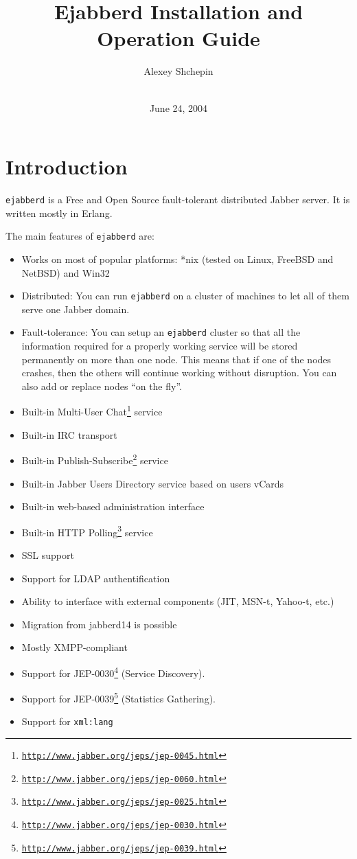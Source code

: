 \documentclass[a4paper,10pt]{article}
\title{Ejabberd Installation and Operation Guide}
\author{Alexey Shchepin \\
  \ahrefurl{mailto:alexey@sevcom.net} \\
  \ahrefurl{xmpp:aleksey@jabber.ru}}
\date{June 24, 2004}
\newcommand{\logoscale}{0.7}
\newcommand{\insscaleimg}[2]{
  \imgsrc{#2}{}
  \begin{latexonly}
    \scalebox{#1}{\texttt{[image: \#2]}}
  \end{latexonly}
}
\newcommand{\ns}[1]{\texttt{#1}}
\newcommand{\ejabberd}{\texttt{ejabberd}}
\newcommand{\Jabber}{Jabber}
\gdef\footahref#1#2{#2\footnote{\href{#1}{\texttt{#1}}}}
\newcommand{\tjepref}[2]{\footahref{http://www.jabber.org/jeps/jep-#1.html}{#2}}
\newcommand{\jepref}[1]{\tjepref{#1}{JEP-#1}}
\begin{document}
\begin{titlepage}
  \maketitle{}
  
  {\centering
    \insscaleimg{\logoscale}{logo.png}
    \par
  }
\end{titlepage}
\tableofcontents{}

\newpage
\section{Introduction}
\label{sec:intro}

\ejabberd{} is a Free and Open Source fault-tolerant distributed \Jabber{}
server.  It is written mostly in Erlang.

The main features of \ejabberd{} are:
\begin{itemize}
\item Works on most of popular platforms: *nix (tested on Linux, FreeBSD and
  NetBSD) and Win32
\item Distributed: You can run \ejabberd{} on a cluster of machines to let all of
  them serve one Jabber domain.
\item Fault-tolerance: You can setup an \ejabberd{} cluster so that all the
  information required for a properly working service will be stored
  permanently on more than one node.  This means that if one of the nodes
  crashes, then the others will continue working without disruption.
  You can also add or replace nodes ``on the fly''.
\item Built-in \tjepref{0045}{Multi-User Chat} service
\item Built-in IRC transport
\item Built-in \tjepref{0060}{Publish-Subscribe} service
\item Built-in Jabber Users Directory service based on users vCards
\item Built-in web-based administration interface
\item Built-in \tjepref{0025}{HTTP Polling} service
\item SSL support
\item Support for LDAP authentification
\item Ability to interface with external components (JIT, MSN-t, Yahoo-t, etc.)
\item Migration from jabberd14 is possible
\item Mostly XMPP-compliant
\item Support for \jepref{0030} (Service Discovery).
\item Support for \jepref{0039} (Statistics Gathering).
\item Support for \ns{xml:lang}
\end{itemize}
\end{document}
